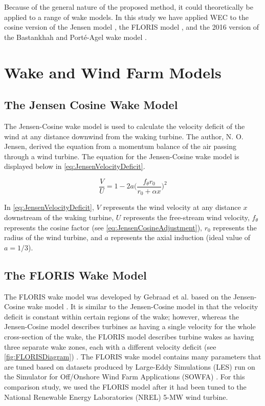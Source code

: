 \documentclass[a4paper]{jpconf}
\begin{document}
Because of the general nature of the proposed method, it could theoretically be applied to a range of wake models. In this study we have applied WEC to the cosine version of the Jensen model \cite{jensen1983}, the FLORIS model \cite{gebraad2014,thomas2017-Improving-FLORIS}, and the 2016 version of the Bastankhah and Port\'e-Agel wake model \cite{bastankhah2016}.

\section{Wake and Wind Farm Models}
\subsection{The Jensen Cosine Wake Model}
The Jensen-Cosine wake model is used to calculate the velocity deficit of the wind at any distance downwind from the waking turbine. The author, N. O. Jensen, derived the equation from a momentum balance of the air passing through a wind turbine. The equation for the Jensen-Cosine wake model is displayed below in \cref{eq:JensenVelocityDeficit}.

\begin{equation}
    \frac{V}{U} = 1 - 2a \bigg(\frac{f_\theta r_0}{r_0 + \alpha x} \bigg)^2
    \label{eq:JensenVelocityDeficit}
\end{equation}

In \cref{eq:JensenVelocityDeficit}, $V$ represents the wind velocity at any distance $x$ downstream of the waking turbine, $U$ represents the free-stream wind velocity, $f_\theta$ represents the cosine factor (see \cref{eq:JensenCosineAdjustment}), $r_0$ represents the radius of the wind turbine, and $a$ represents the axial induction (ideal value of $a = 1/3$).

\subsection{The FLORIS Wake Model}
The FLORIS wake model was developed by Gebraad et al. based on the Jensen-Cosine wake model \cite{Gebraad2014}. It is similar to the Jensen-Cosine model in that the velocity deficit is constant within certain regions of the wake; however, whereas the Jensen-Cosine model describes turbines as having a single velocity for the whole cross-section of the wake, the FLORIS model describes turbine wakes as having three separate wake zones, each with a different velocity deficit (see \cref{fig:FLORISDiagram}) \cite{Gebraad2014}. The FLORIS wake model contains many parameters that are tuned based on datasets produced by Large-Eddy Simulations (LES) run on the Simulator for Off/Onshore Wind Farm Applications (SOWFA) \cite{Fleming2015}. For this comparison study, we used the FLORIS model after it had been tuned to the National Renewable Energy Laboratories (NREL) 5-MW wind turbine.
\end{document}
